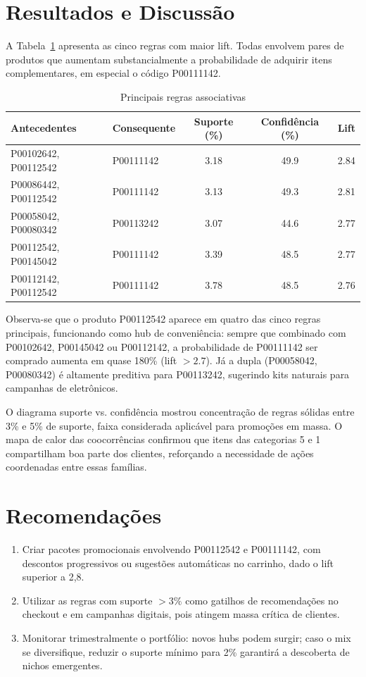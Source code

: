 ﻿\documentclass[12pt]{article}
\begin{document}
\section{Resultados e Discussão}
A Tabela~\ref{tab:regras} apresenta as cinco regras com maior lift. Todas envolvem pares de produtos que aumentam substancialmente a probabilidade de adquirir itens complementares, em especial o código P00111142.

\begin{table}[H]
    \centering
    \caption{Principais regras associativas}
    \label{tab:regras}
    \begin{tabular}{p{5cm}p{3cm}ccc}
        \toprule
        Antecedentes & Consequente & Suporte (\%) & Confidência (\%) & Lift \\
        \midrule
        P00102642, P00112542 & P00111142 & \num{3.18} & \num{49.9} & \num{2.84} \\
        P00086442, P00112542 & P00111142 & \num{3.13} & \num{49.3} & \num{2.81} \\
        P00058042, P00080342 & P00113242 & \num{3.07} & \num{44.6} & \num{2.77} \\
        P00112542, P00145042 & P00111142 & \num{3.39} & \num{48.5} & \num{2.77} \\
        P00112142, P00112542 & P00111142 & \num{3.78} & \num{48.5} & \num{2.76} \\
        \bottomrule
    \end{tabular}
\end{table}

Observa-se que o produto P00112542 aparece em quatro das cinco regras principais, funcionando como hub de conveniência: sempre que combinado com P00102642, P00145042 ou P00112142, a probabilidade de P00111142 ser comprado aumenta em quase 180\% (lift $>2.7$). Já a dupla (P00058042, P00080342) é altamente preditiva para P00113242, sugerindo kits naturais para campanhas de eletrônicos.

O diagrama suporte vs. confidência mostrou concentração de regras sólidas entre 3\% e 5\% de suporte, faixa considerada aplicável para promoções em massa. O mapa de calor das coocorrências confirmou que itens das categorias 5 e 1 compartilham boa parte dos clientes, reforçando a necessidade de ações coordenadas entre essas famílias.

\section{Recomendações}
\begin{enumerate}
    \item Criar pacotes promocionais envolvendo P00112542 e P00111142, com descontos progressivos ou sugestões automáticas no carrinho, dado o lift superior a 2,8.
    \item Utilizar as regras com suporte \(>3\%\) como gatilhos de recomendações no checkout e em campanhas digitais, pois atingem massa crítica de clientes.
    \item Monitorar trimestralmente o portfólio: novos hubs podem surgir; caso o mix se diversifique, reduzir o suporte mínimo para 2\% garantirá a descoberta de nichos emergentes.
\end{enumerate}
\end{document}
